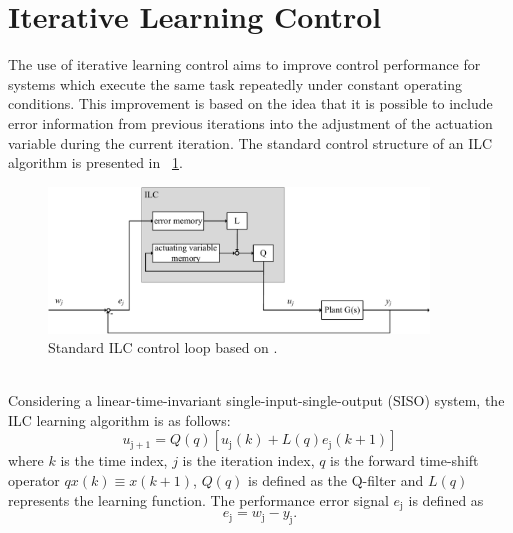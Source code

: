 \section{Iterative Learning Control}\label{ILC}
The use of iterative learning control aims to improve control performance for systems which execute the same task repeatedly under constant operating conditions. This improvement is based on the idea that it is possible to include error information from previous iterations into the adjustment of the actuation variable during the current iteration.
The standard control structure of an ILC algorithm is presented in \figurename~\ref{fig:ILC_only}.
\begin{figure}[ht]
   \centering
   \includegraphics[width=0.9\textwidth]{images/chapt_3/ILC_only.pdf}
   \caption[Standard ILC control loop]{Standard ILC control loop based on \cite{ILC2}.}
   \label{fig:ILC_only}
 \end{figure}
\\Considering a linear-time-invariant single-input-single-output (SISO) system, the ILC learning algorithm is as follows:
\begin{equation}
    u_{\mathrm{j+1}}  = Q(q)[u_{\mathrm{j}}(k)+L(q)e_{\mathrm{j}}(k+1)]
 \label{eq:ILC_standard}
\end{equation}
where $k$ is the time index, $j$ is the iteration index, $q$ is the forward time-shift operator $qx(k) \equiv x(k + 1)$, $Q(q)$ is defined as the Q-filter and $L(q)$ represents the learning function. The performance error signal $e_{\mathrm{j}}$ is defined as
\begin{equation}
    e_{\mathrm{j}}  = w_{\mathrm{j}}-y_{\mathrm{j}}.
 \label{eq:perf_error}
\end{equation}

